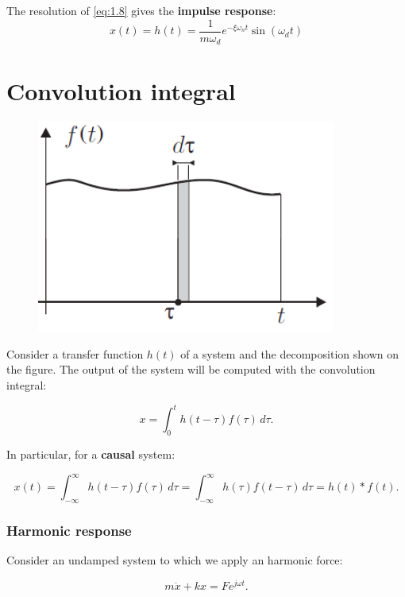 				The resolution of \eqref{eq:1.8} gives the \textbf{impulse response}:
				\begin{equation}
				x(t) = h(t) = \frac{1}{m\omega _d} e^{- \xi\omega _n t} \sin (\omega _d t)
\end{equation}				 

	\section{Convolution integral}
		\begin{figure}
		\vspace{-5mm}
		\includegraphics[scale=0.4]{ch1/8}
		\end{figure}
		Consider a transfer function $h(t)$ of a system and the decomposition shown on the figure. The output of the system will be computed with the convolution integral:
		
		\begin{equation}
		x = \int _0^t h(t-\tau)f(\tau) \, d\tau.
		\end{equation}
		
		In particular, for a \textbf{causal} system:
		
		\begin{equation}
		x(t) = \int _{-\infty}^{\infty} h(t-\tau)f(\tau)\, d\tau = \int _{-\infty}^{\infty} h(\tau)f(t-\tau)\, d\tau = h(t)*f(t).
		\end{equation}	
		
		\subsubsection{Harmonic response}
			Consider an undamped system	to which we apply an harmonic force:
			
			\begin{equation}
			m \ddot{x} + kx = F e^{j\omega t}.
			\end{equation}
			
